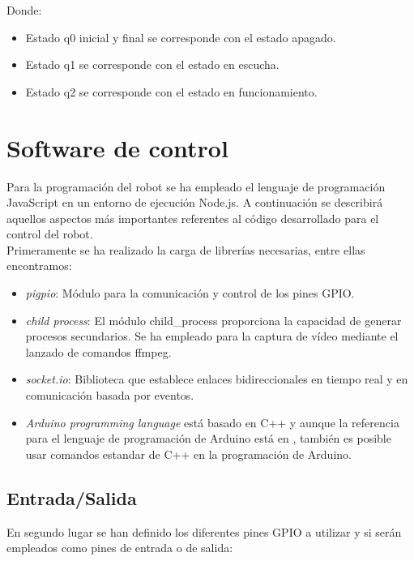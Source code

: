 Donde:\\

\begin{itemize}
  \item Estado q0 inicial y final se corresponde con el estado apagado.
 \item Estado q1 se corresponde con el estado en escucha.
 \item Estado q2 se corresponde con el estado en funcionamiento.
\end{itemize}


\section{Software de control}
 
Para la programación del robot se ha empleado el lenguaje de programación JavaScript en un entorno de ejecución Node.js. A continuación se describirá aquellos aspectos más importantes
referentes al código desarrollado para el control del robot.\\

Primeramente se ha realizado la carga de librerías necesarias, entre ellas encontramos:

\begin{itemize}
 \item \emph{pigpio}: Módulo para la comunicación y control de los pines GPIO.
 \item \emph{child process}: El módulo child\_process proporciona la capacidad de generar procesos secundarios. Se ha empleado para la captura de vídeo mediante el lanzado de comandos ffmpeg.
 \item \emph{socket.io}: Biblioteca que establece enlaces bidireccionales en tiempo real y en comunicación basada por eventos.
 \item \emph{Arduino programming language}  está basado en C++ y aunque la referencia para el lenguaje de programación de Arduino está en \href{http://arduino.cc/en/Reference/HomePage}, también es posible usar comandos estandar de C++ en la programación de Arduino.
\end{itemize}


\subsection{Entrada/Salida}

En segundo lugar se han definido los diferentes pines GPIO a utilizar y si serán empleados como pines de entrada o de salida:

